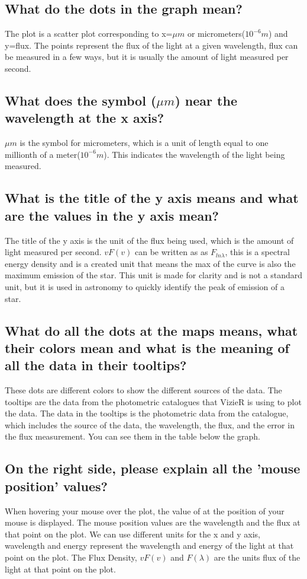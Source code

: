 \documentclass[12pt,oneside,a4paper,english]{article}
\begin{document}
\subsection{What do the dots in the graph mean?}
The plot is a scatter plot corresponding to x=$\mu m$ or micrometers($10^{-6}m$) and y=flux. The points represent the flux of the light at a given wavelength, flux can be measured in a few ways, but it is usually the amount of light measured per second.
\subsection{What does the symbol ($\mu m$) near the wavelength at the x axis?}
$\mu m$ is the symbol for micrometers, which is a unit of length equal to one millionth of a meter($10^{-6}m$). This indicates the wavelength of the light being measured.
\subsection{What is the title of the y axis means and what are the values in the y axis mean?}
The title of the y axis is the unit of the flux being used, which is the amount of light measured per second. $vF(v)$ can be written as as $F_{ln \lambda }$, this is a spectral energy density and is a created unit that means the max of the curve is also the maximum emission of the star. This unit is made for clarity and is not a standard unit, but it is used in astronomy to quickly identify the peak of emission of a star. 
\subsection{What do all the dots at the maps means, what their colors mean and what is the meaning of all the data in their tooltips?}
These dots are different colors to show the different sources of the data. The tooltips are the data from the photometric catalogues that VizieR is using to plot the data. The data in the tooltips is the photometric data from the catalogue, which includes the source of the data, the wavelength, the flux, and the error in the flux measurement. You can see them in the table below the graph.
\subsection{On the right side, please explain all the 'mouse position' values?}
When hovering your mouse over the plot, the value of at the position of your mouse is displayed. The mouse position values are the wavelength and the flux at that point on the plot. We can use different units for the x and y axis, wavelength and energy represent the wavelength and energy of the light at that point on the plot. The Flux Density, $vF(v)$ and $F(\lambda)$ are the units flux of the light at that point on the plot.
\end{document}

